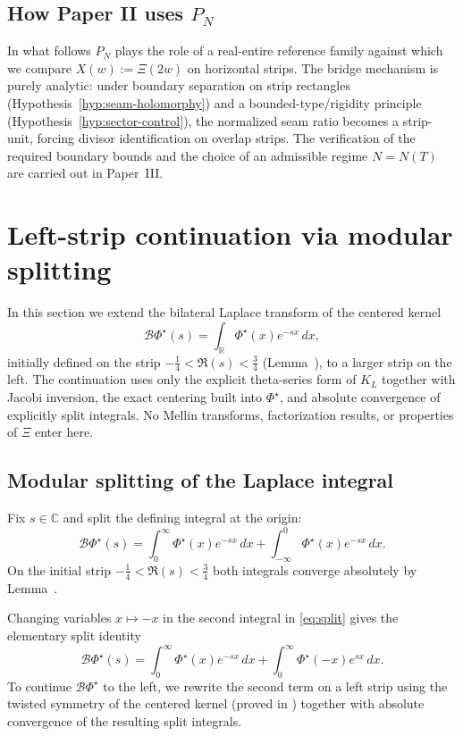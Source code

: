 \documentclass[11pt]{amsart}
\theoremstyle{definition}
\theoremstyle{remark}
\newcommand{\R}{\mathbb{R}}
\newcommand{\C}{\mathbb{C}}
\begin{document}
\subsection{How Paper II uses $P_N$}
In what follows $P_N$ plays the role of a real-entire reference family against which we compare
$X(w):=\Xi(2w)$ on horizontal strips.  The bridge mechanism is purely analytic: under boundary
separation on strip rectangles (Hypothesis~\ref{hyp:seam-holomorphy}) and a bounded-type/rigidity
principle (Hypothesis~\ref{hyp:sector-control}), the normalized seam ratio becomes a strip-unit, forcing
divisor identification on overlap strips.  The verification of the required boundary bounds and the
choice of an admissible regime $N=N(T)$ are carried out in Paper~III.


\section{Left-strip continuation via modular splitting}
\label{sec:lb-continuation}

In this section we extend the bilateral Laplace transform of the centered kernel
\[
\mathcal B\Phi^{\star}(s)=\int_{\R}\Phi^{\star}(x)e^{-sx}\,dx,
\]
initially defined on the strip $-\tfrac14<\Re(s)<\tfrac34$
(Lemma~\cite{PaperI}), to a larger strip on the left.
The continuation uses only the explicit theta-series form of $K_L$ together with Jacobi inversion,
the exact centering built into $\Phi^{\star}$, and absolute convergence of explicitly split integrals.
No Mellin transforms, factorization results, or properties of $\Xi$ enter here.

\subsection{Modular splitting of the Laplace integral}

Fix $s\in\C$ and split the defining integral at the origin:
\begin{equation}
\label{eq:split}
\mathcal B\Phi^{\star}(s)
=
\int_{0}^{\infty}\Phi^{\star}(x)e^{-sx}\,dx
+
\int_{-\infty}^{0}\Phi^{\star}(x)e^{-sx}\,dx.
\end{equation}
On the initial strip $-\tfrac14<\Re(s)<\tfrac34$ both integrals converge
absolutely by Lemma~\cite{PaperI}.

Changing variables $x\mapsto -x$ in the second integral in \eqref{eq:split} gives the elementary
split identity
\begin{equation}
\label{eq:modular-split}
\mathcal B\Phi^{\star}(s)
=
\int_{0}^{\infty}\Phi^{\star}(x)e^{-sx}\,dx
+
\int_{0}^{\infty}\Phi^{\star}(-x)e^{s x}\,dx.
\end{equation}
To continue $\mathcal B\Phi^{\star}$ to the left, we rewrite the second term on a left strip using
the twisted symmetry of the centered kernel (proved in \cite{PaperI}) together with absolute
convergence of the resulting split integrals.
\end{document}
